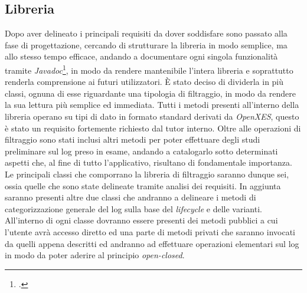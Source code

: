 \subsection{Libreria}
Dopo aver delineato i principali requisiti da dover soddisfare sono passato alla fase di progettazione, cercando di strutturare la libreria in modo semplice, ma allo stesso tempo efficace, andando a documentare ogni singola funzionalità tramite \textit{\gls{Javadoc}}\footcite{Javadoc: https://docs.oracle.com/javase/8/docs/technotes/tools/windows/javadoc.html}, in modo da rendere mantenibile l'intera libreria e soprattutto renderla comprensione ai futuri utilizzatori. È stato deciso di dividerla in più classi, ognuna di esse riguardante una tipologia di filtraggio, in modo da rendere la sua lettura più semplice ed immediata. Tutti i metodi presenti all'interno della libreria operano su tipi di dato in formato standard derivati da \textit{OpenXES}, questo è stato un requisito fortemente richiesto dal tutor interno. Oltre alle operazioni di filtraggio sono stati inclusi altri metodi per poter effettuare degli studi preliminare sul log preso in esame, andando a catalogarlo sotto determinati aspetti che, al fine di tutto l'applicativo, risultano di fondamentale importanza. Le principali classi che comporrano la libreria di filtraggio saranno dunque sei, ossia quelle che sono state delineate tramite analisi dei requisiti.
In aggiunta saranno presenti altre due classi che andranno a delineare i metodi di categorizzazione generale del log sulla base del \textit{lifecycle} e delle varianti. All'interno di ogni classe dovranno essere presenti dei metodi pubblici a cui l'utente avrà accesso diretto ed una parte di metodi privati che saranno invocati da quelli appena descritti ed andranno ad effettuare operazioni elementari sul log in modo da poter aderire al principio \textit{\gls{open-closed}}.
